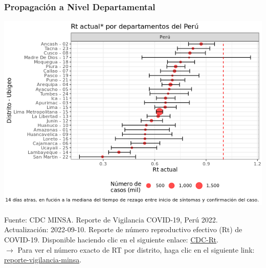 \documentclass[xcolor=table]{beamer}
\begin{document}
\begin{frame}
	\frametitle{Propagación a Nivel Departamental}
	\vspace{-.5cm}
	\begin{center}
		\includegraphics[width=0.75\linewidth, trim={0cm .5cm 0cm 0.2cm},clip]{../sala_nacional/rt_cusco.png}
	\end{center}
	{\tiny Fuente: CDC MINSA. Reporte de Vigilancia COVID-19, Perú 2022. Actualización: 2022-09-10. Reporte de número reproductivo efectivo (Rt) de COVID-19. Disponible haciendo clic en el siguiente enlace: \href{https://www.dge.gob.pe/portalnuevo/informacion-publica/reporte-de-numero-reproductivo-efectivo-rt/}{CDC-Rt}. \\}
	\vspace{0.01cm}
	$\rightarrow$ Para ver el número exacto de RT por distrito, haga clic en el siguiente link: \href{https://www.dge.gob.pe/portalnuevo/informacion-publica/reporte-de-numero-reproductivo-efectivo-rt/}{\color{mycolor3}reporte-vigilancia-minsa}. \\
\end{frame}
	
\end{document}
